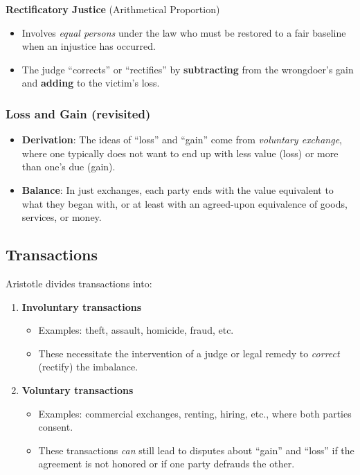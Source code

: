                 \begin{definition}
                    \textbf{Rectificatory Justice} (Arithmetical Proportion)
                    \begin{itemize}
                      \item Involves \textit{equal persons} under the law who must be restored to a fair baseline when an injustice has occurred.
                      \item The judge ``corrects'' or ``rectifies'' by \textbf{subtracting} from the wrongdoer's gain and \textbf{adding} to the victim's loss.
                    \end{itemize}
                \end{definition}

                \subsubsection{Loss and Gain (revisited)}

                    \begin{itemize}
                      \item \textbf{Derivation}: The ideas of ``loss'' and ``gain'' come from \textit{voluntary exchange}, where one typically does not want to end up with less value (loss) or more than one's due (gain).
                      \item \textbf{Balance}: In just exchanges, each party ends with the value equivalent to what they began with, or at least with an agreed-upon equivalence of goods, services, or money.
                    \end{itemize}

            \subsection{Transactions}

                Aristotle divides transactions into:
                \begin{enumerate}
                  \item \textbf{Involuntary transactions}
                    \begin{itemize}
                      \item Examples: theft, assault, homicide, fraud, etc.
                      \item These necessitate the intervention of a judge or legal remedy to \textit{correct} (rectify) the imbalance.
                    \end{itemize}
                  \item \textbf{Voluntary transactions}
                    \begin{itemize}
                      \item Examples: commercial exchanges, renting, hiring, etc., where both parties consent.
                      \item These transactions \textit{can} still lead to disputes about ``gain'' and ``loss'' if the agreement is not honored or if one party defrauds the other.
                    \end{itemize}
                \end{enumerate}

